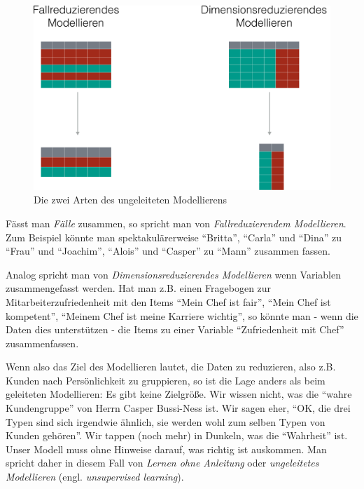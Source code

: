 \documentclass[12pt,ngerman,]{book}
\begin{document}
\begin{figure}

{\centering \includegraphics[width=0.7\linewidth]{images/modellieren/ungeleitetes_modellieren_crop} 

}

\caption{Die zwei Arten des ungeleiteten Modellierens}\label{fig:ungeleitetes-modellieren}
\end{figure}

Fässt man \emph{Fälle} zusammen, so spricht man von
\emph{Fallreduzierendem
Modellieren}. Zum Beispiel könnte
man spektakulärerweise ``Britta'', ``Carla'' und ``Dina'' zu ``Frau''
und ``Joachim'', ``Alois'' und ``Casper'' zu ``Mann'' zusammen fassen.

Analog spricht man von \emph{Dimensionsreduzierendes
Modellieren} wenn Variablen
zusammengefasst werden. Hat man z.B. einen Fragebogen zur
Mitarbeiterzufriedenheit mit den Items ``Mein Chef ist fair'', ``Mein
Chef ist kompetent'', ``Meinem Chef ist meine Karriere wichtig'', so
könnte man - wenn die Daten dies unterstützen - die Items zu einer
Variable ``Zufriedenheit mit Chef'' zusammenfassen.

Wenn also das Ziel des Modellieren lautet, die Daten zu reduzieren, also
z.B. Kunden nach Persönlichkeit zu gruppieren, so ist die Lage anders
als beim geleiteten Modellieren: Es gibt keine Zielgröße. Wir wissen
nicht, was die ``wahre Kundengruppe'' von Herrn Casper Bussi-Ness ist.
Wir sagen eher, ``OK, die drei Typen sind sich irgendwie ähnlich, sie
werden wohl zum selben Typen von Kunden gehören''. Wir tappen (noch
mehr) in Dunkeln, was die ``Wahrheit'' ist. Unser Modell muss ohne
Hinweise darauf, was richtig ist auskommen. Man spricht daher in diesem
Fall von \emph{Lernen ohne Anleitung} oder
\emph{ungeleitetes Modellieren} (engl. \emph{unsupervised
learning}).
\end{document}
